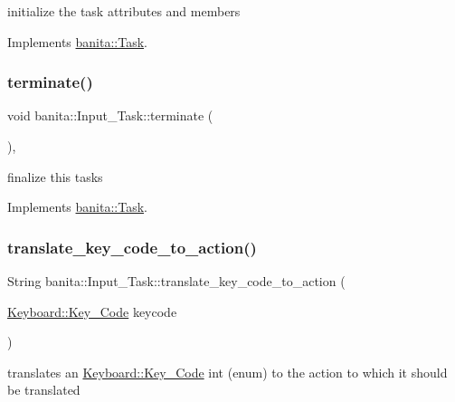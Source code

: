 initialize the task attributes and members 



Implements \mbox{\hyperlink{classbanita_1_1_task_a34578cdd41899a338ac09fec3a285487}{banita\+::\+Task}}.

\mbox{\label{classbanita_1_1_input___task_af6f524863581208331f6dd08d7e1cbb5}} 
\subsubsection{\texorpdfstring{terminate()}{terminate()}}
{\footnotesize\ttfamily void banita\+::\+Input\+\_\+\+Task\+::terminate (\begin{DoxyParamCaption}{ }\end{DoxyParamCaption})\hspace{0.3cm}{\ttfamily [override]}, {\ttfamily [virtual]}}



finalize this tasks 



Implements \mbox{\hyperlink{classbanita_1_1_task_acccbd449402b1e9ce1ba34c26333a1b6}{banita\+::\+Task}}.

\mbox{\label{classbanita_1_1_input___task_a3c49cbbd067e4eb65a55393207b69bdc}} 
\subsubsection{\texorpdfstring{translate\_key\_code\_to\_action()}{translate\_key\_code\_to\_action()}}
{\footnotesize\ttfamily String banita\+::\+Input\+\_\+\+Task\+::translate\+\_\+key\+\_\+code\+\_\+to\+\_\+action (\begin{DoxyParamCaption}\item[{\mbox{\hyperlink{classbanita_1_1_keyboard_a0dee214e6cb4f246866603b85568b9ab}{Keyboard\+::\+Key\+\_\+\+Code}}}]{keycode }\end{DoxyParamCaption})}



translates an \mbox{\hyperlink{classbanita_1_1_keyboard_a0dee214e6cb4f246866603b85568b9ab}{Keyboard\+::\+Key\+\_\+\+Code}} int (enum) to the action to which it should be translated 


